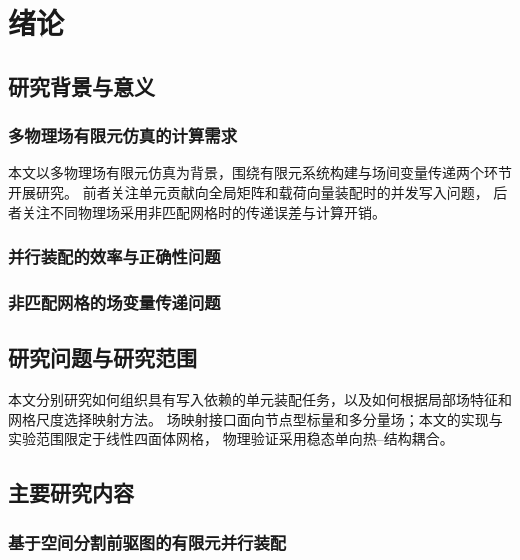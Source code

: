 \chapter{绪论}
\label{chap:introduction}

\section{研究背景与意义}
\subsection{多物理场有限元仿真的计算需求}
本文以多物理场有限元仿真为背景，围绕有限元系统构建与场间变量传递两个环节开展研究。
前者关注单元贡献向全局矩阵和载荷向量装配时的并发写入问题，
后者关注不同物理场采用非匹配网格时的传递误差与计算开销。

\subsection{并行装配的效率与正确性问题}
\thesisdraftnote

\subsection{非匹配网格的场变量传递问题}
\thesisdraftnote

\section{研究问题与研究范围}
本文分别研究如何组织具有写入依赖的单元装配任务，以及如何根据局部场特征和网格尺度选择映射方法。
场映射接口面向节点型标量和多分量场；本文的实现与实验范围限定于线性四面体网格，
物理验证采用稳态单向热--结构耦合。

\section{主要研究内容}
\subsection{基于空间分割前驱图的有限元并行装配}
\thesisdraftnote

